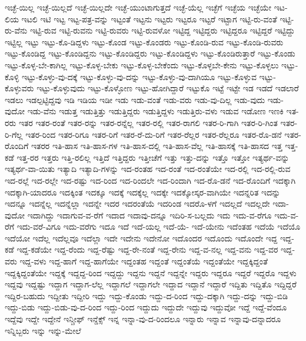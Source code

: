 {ಇಚ್ಛೆ-ಯಿಲ್ಲ
ಇಚ್ಛೆ-ಯಿಲ್ಲದೆ
ಇಚ್ಛೆ-ಯಿಲ್ಲದೇ
ಇಚ್ಛೆ-ಯುಂಟಾಗುತ್ತದೆ
ಇಚ್ಛೆ-ಯೆಲ್ಲ
ಇಚ್ಛೆಗೆ
ಇಚ್ಛೆಯ
ಇಚ್ಛೆಯೇ
ಇಟ-ಲಿಯ
ಇಟಲಿ
ಇಟಿ
ಇಟ್ಟ
ಇಟ್ಟ-ಪತ್ರ-ವನ್ನು
ಇಟ್ಟಂತೆ
ಇಟ್ಟನು
ಇಟ್ಟರು
ಇಟ್ಟರೂ
ಇಟ್ಟರೆ
ಇಟ್ಟಾಗ
ಇಟ್ಟಿ-ರು-ವಂತೆ
ಇಟ್ಟಿ-ರು-ವೆನು
ಇಟ್ಟಿ-ರುವ
ಇಟ್ಟಿ-ರುವನು
ಇಟ್ಟಿ-ರುವರು
ಇಟ್ಟಿ-ರುವಳೋ
ಇಟ್ಟಿದ್ದ
ಇಟ್ಟಿದ್ದರು
ಇಟ್ಟಿದ್ದರೂ
ಇಟ್ಟಿದ್ದರೆ
ಇಟ್ಟಿದ್ದು
ಇಟ್ಟಿಲ್ಲ
ಇಟ್ಟು
ಇಟ್ಟು-ಕೊ-ಡಿದ್ದಳು
ಇಟ್ಟು-ಕೊಂಡ
ಇಟ್ಟು-ಕೊಂಡರು
ಇಟ್ಟು-ಕೊಂಡಿ-ರುವ
ಇಟ್ಟು-ಕೊಂಡಿ-ರುವರು
ಇಟ್ಟು-ಕೊಂಡಿದ್ದ
ಇಟ್ಟು-ಕೊಂಡಿದ್ದನು
ಇಟ್ಟು-ಕೊಂಡಿದ್ದರು
ಇಟ್ಟು-ಕೊಂಡಿದ್ದಳು
ಇಟ್ಟು-ಕೊಂಡಿರುತ್ತಾರೆ
ಇಟ್ಟು-ಕೊಂಡು
ಇಟ್ಟು-ಕೊಳ್ಳ-ಬೇ-ಕಾಗಿಲ್ಲ
ಇಟ್ಟು-ಕೊಳ್ಳ-ಬೇಕು
ಇಟ್ಟು-ಕೊಳ್ಳ-ಬೇಕೆಂದು
ಇಟ್ಟು-ಕೊಳ್ಳಬೇ-ಕೇನು
ಇಟ್ಟು-ಕೊಳ್ಳಲು
ಇಟ್ಟು-ಕೊಳ್ಳಿ
ಇಟ್ಟು-ಕೊಳ್ಳು-ವು-ದಕ್ಕೆ
ಇಟ್ಟು-ಕೊಳ್ಳು-ವು-ದನ್ನು
ಇಟ್ಟು-ಕೊಳ್ಳು-ವು-ದಾಗಿಯೂ
ಇಟ್ಟು-ಕೊಳ್ಳುವ
ಇಟ್ಟು-ಕೊಳ್ಳುವರು
ಇಟ್ಟು-ಕೊಳ್ಳುವುದು
ಇಟ್ಟು-ಕೊಳ್ಳೋಣ
ಇಟ್ಟು-ಹೋಗಿದ್ದಾರೆ
ಇಟ್ಟುಕೊ
ಇಟ್ಟೆ
ಇಟ್ಟೇ
ಇಡ
ಇಡದೆ
ಇಡಲಾರೆ
ಇಡಲು
ಇಡಲ್ಪಟ್ಟಿದ್ದವು
ಇಡಿ
ಇಡಿಯ
ಇಡೀ
ಇಡು
ಇಡು-ವಂತೆ
ಇಡು-ವರು
ಇಡು-ವು-ದಿಲ್ಲ
ಇಡು-ವುದು
ಇಡು-ವುದೋ
ಇಡು-ವೆನು
ಇಡುತ್ತ
ಇಡುತ್ತಿತ್ತು
ಇಡುತ್ತಿದ್ದರು
ಇಡುತ್ತಿದ್ದಳು
ಇಡುತ್ತಿರು-ವಳು
ಇಡುವ
ಇಡೋಣ
ಇಣಕಿ
ಇತ-ರರು
ಇತರ
ಇತರ-ರಂತೆ
ಇತರ-ರನ್ನು
ಇತರ-ರನ್ನೆಲ್ಲ
ಇತರ-ರಲ್ಲಿ
ಇತರ-ರಾಗಲಿ
ಇತರ-ರಿ-ಗಾಗಿ
ಇತರ-ರಿ-ಗಿಂತ
ಇತರ-ರಿ-ಗೆಲ್ಲ
ಇತರ-ರಿಂದ
ಇತರ-ರಿಗೂ
ಇತರ-ರಿಗೆ
ಇತರ-ರೆ-ದು-ರಿಗೆ
ಇತರ-ರೆಲ್ಲರ
ಇತರ-ರೆಲ್ಲರೂ
ಇತರ-ರೊ-ಡನೆ
ಇತರ-ರೊಂದಿಗೆ
ಇತರರ
ಇತಿ-ಹಾಸ
ಇತಿ-ಹಾಸ-ಗಳ
ಇತಿ-ಹಾಸ-ದಲ್ಲಿ
ಇತಿ-ಹಾಸ-ವೆಲ್ಲ
ಇತಿ-ಹಾಸಕ್ಕೆ
ಇತಿ-ಹಾಸದ
ಇತ್ತ
ಇತ್ತ-ಕಡೆ
ಇತ್ತ-ರರ
ಇತ್ತರು
ಇತ್ತಿ-ರಲಿಲ್ಲ
ಇತ್ತಿದೆ
ಇತ್ತಿದ್ದರು
ಇತ್ತೀಚೆಗೆ
ಇತ್ತು
ಇತ್ತು-ದನ್ನು
ಇತ್ತೊ
ಇತ್ತೋ
ಇತ್ಯರ್ಥ-ವನ್ನು
ಇತ್ಯರ್ಥ-ವಾ-ಯಿತು
ಇತ್ಯಾದಿ
ಇತ್ಯಾದಿ-ಗಳನ್ನು
ಇದ-ರಂತಹ
ಇದ-ರಂತೆ
ಇದ-ರಂತೆಯೇ
ಇದ-ರಲ್ಲಿ
ಇದ-ರಲ್ಲಿ-ರುವ
ಇದ-ರಲ್ಲೆ
ಇದ-ರಲ್ಲೇ
ಇದ-ರಷ್ಟು
ಇದ-ರಿಂದ
ಇದ-ರಿಂದಲೇ
ಇದ-ರಿಂದಾಗಿ
ಇದ-ರೊ-ಡನೆ
ಇದ-ರೊಂದಿಗೆ
ಇದಕ್ಕಾಗಿ
ಇದಕ್ಕಾಗಿ-ಯಾದರೂ
ಇದಕ್ಕಿಂತ
ಇದಕ್ಕೂ
ಇದಕ್ಕೆ
ಇದಕ್ಕೆಲ್ಲ
ಇದಕ್ಕೇ
ಇದಕ್ಕೋಸ್ಕರ-ವಾಗಿಯೇ
ಇದನ್ನರಿತ
ಇದನ್ನು
ಇದನ್ನೂ
ಇದನ್ನೆಲ್ಲ
ಇದನ್ನೆಲ್ಲಾ
ಇದನ್ನೇ
ಇದರ
ಇದರಂತೆಯೆ
ಇದರಿಂಡ
ಇದರೊ-ಳಗೆ
ಇದಲ್ಲದೆ
ಇದಲ್ಲದೇ
ಇದಾ-ವುದೋ
ಇದಾಗಿದ್ದು
ಇದಾಗುವ-ವ-ರೆಗೆ
ಇದಾದ
ಇದಾವು-ದನ್ನೂ
ಇದಿರಿ-ಸ-ಬಲ್ಲದು
ಇದು
ಇದು-ವ-ರೆಗೂ
ಇದು-ವ-ರೆಗೆ
ಇದು-ವರೆ-ವಿಗೂ
ಇದು-ವರೆಗು
ಇದೂ
ಇದೆ
ಇದೆ-ಯಲ್ಲ
ಇದೆ-ಯೆ-
ಇದೆ-ಯೇನು
ಇದೆಂತಹ
ಇದೆಯೆ
ಇದೆಯೊ
ಇದೆಯೋ
ಇದೆಲ್ಲ
ಇದೆಲ್ಲವೂ
ಇದೆಲ್ಲಾ
ಇದೇ
ಇದೇನು
ಇದೇನೋ
ಇದೊಂದರ
ಇದೊಂದು
ಇದೊಂದೇ
ಇದ್ದ
ಇದ್ದ-ಕಡೆ
ಇದ್ದ-ಕಡೆಯೇ
ಇದ್ದ-ರೆಂದು
ಇದ್ದ-ರೆಷ್ಟು
ಇದ್ದ-ರೇ-ನಂತೆ
ಇದ್ದ-ರೇನು
ಇದ್ದ-ವ-ನಲ್ಲ
ಇದ್ದ-ವನು
ಇದ್ದ-ವರ
ಇದ್ದ-ವರು
ಇದ್ದ-ವಳು
ಇದ್ದ-ಹಾಗೆ
ಇದ್ದ-ಹಾಗೆಯೇ
ಇದ್ದಂತಹ
ಇದ್ದಂತೆ
ಇದ್ದಂತೆಯೆ
ಇದ್ದಂತೆಯೇ
ಇದ್ದಕ್ಕಿದ್ದಂತೆ
ಇದ್ದಕ್ಕಿದ್ದಂತೆಯೇ
ಇದ್ದಕ್ಕೆ
ಇದ್ದದ್ದ-ರಿಂದ
ಇದ್ದದ್ದು
ಇದ್ದನು
ಇದ್ದನೆ
ಇದ್ದನ್ನೇ
ಇದ್ದರು
ಇದ್ದರೂ
ಇದ್ದರೆ
ಇದ್ದರೊ
ಇದ್ದಳು
ಇದ್ದವು
ಇದ್ದಷ್ಟು
ಇದ್ದಾಗ
ಇದ್ದಾಗ-ಲೆಲ್ಲ
ಇದ್ದಾಗಲೆ
ಇದ್ದಾಗಲೇ
ಇದ್ದಾದ
ಇದ್ದಾನೆ
ಇದ್ದಾರೆ
ಇದ್ದಿತು
ಇದ್ದಿತೊ
ಇದ್ದಿದ್ದರೆ
ಇದ್ದಿರ-ಬಹುದು
ಇದ್ದೀತು
ಇದ್ದೀರಿ
ಇದ್ದು
ಇದ್ದು-ಕೊಂಡು
ಇದ್ದು-ದ-ರಿಂದ
ಇದ್ದು-ದಕ್ಕಾಗಿ
ಇದ್ದು-ದನ್ನು
ಇದ್ದು-ಬಿಡಿ
ಇದ್ದು-ಬಿಡು
ಇದ್ದು-ಬಿಡು-ವು-ದ-ರಿಂದ
ಇದ್ದು-ರಿಂದ
ಇದ್ದುದು
ಇದ್ದುದೇ
ಇದ್ದುವು
ಇದ್ದುವೋ
ಇದ್ದೆ
ಇದ್ದೆ-ವೆಂದೂ
ಇದ್ದೆವು
ಇದ್ದೇ
ಇದ್ದೇನೆ
ಇನ್ಚೀಫ್
ಇನ್ಡೆಕ್ಸ್
ಇನ್ನ
ಇನ್ನಾ-ವು-ದ-ರಿಂದಲೂ
ಇನ್ನಾರು
ಇನ್ನಾವ
ಇನ್ನಾವು-ದನ್ನಾದರೂ
ಇನ್ನಿಬ್ಬರು
ಇನ್ನು
ಇನ್ನು-ಮೇಲೆ
}
